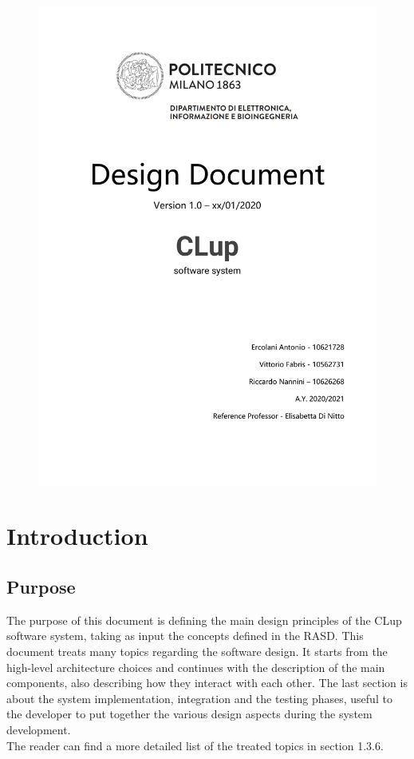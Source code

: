 \documentclass[]{article}
\begin{document}
	
	\begin{figure}[H]
		\centering
		\includegraphics[scale=0.29]{FrontPage.png}
	\end{figure}
	

	\newpage


	\tableofcontents
	
	\newpage
	
	
	\section{Introduction}
	
	\subsection{Purpose}
	The purpose of this document is defining the main design principles of the CLup software system, taking as input the concepts defined in the RASD. This document treats many topics regarding the software design. It starts from the high-level architecture choices and continues with the description of the main components, also describing how they interact with each other. The last section is about the system implementation, integration and the testing phases, useful to the developer to put together the various design aspects during the system development. 
	\\The reader can find a more detailed list of the treated topics in section 1.3.6.
	
\end{document}
